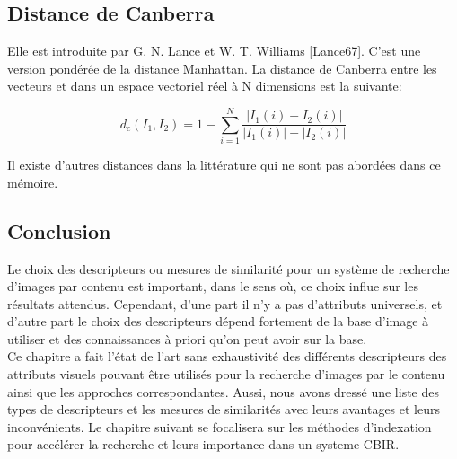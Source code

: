\subsection{Distance de Canberra}
Elle est introduite par G. N. Lance et W. T. Williams [Lance67]. C'est une version
pondérée de la distance Manhattan. La distance de Canberra entre les vecteurs et dans un espace vectoriel réel à N dimensions est la suivante:

\begin{equation}
	d_c(I_1, I_2) = 1- \sum_{i=1}^{N}   \frac{\left|{I}_{1}(i)-{I}_{2}(i)\right|}{\left|{I}_{1}(i)\right| + \left|{I}_{2}(i)\right|}
\end{equation}


Il existe d’autres distances dans la littérature qui ne sont pas abordées dans ce mémoire.


\subsection{Conclusion}
Le choix des descripteurs ou mesures de similarité pour un système de recherche d'images par contenu est important, dans le sens où, ce choix influe sur les résultats attendus. Cependant, d'une part il n'y a pas d'attributs universels, et d'autre part le choix des descripteurs dépend fortement de la base d'image à utiliser et des connaissances à priori qu'on peut avoir sur la base.\\

Ce chapitre a fait l’état de l’art sans exhaustivité des différents descripteurs des attributs visuels pouvant être utilisés pour la recherche d’images par le contenu ainsi que les approches correspondantes. Aussi, nous avons dressé une liste des types de descripteurs et les mesures de similarités avec leurs avantages et leurs inconvénients. Le chapitre suivant se focalisera sur les méthodes d'indexation pour accélérer la recherche et leurs importance dans un systeme CBIR.